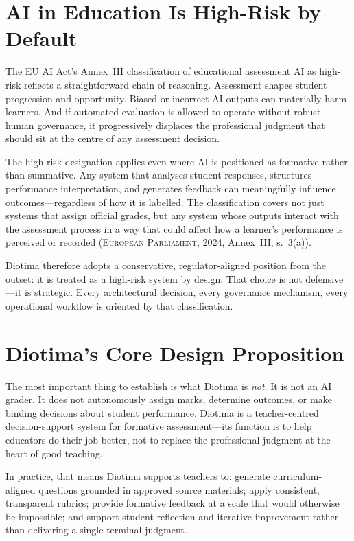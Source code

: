 \documentclass[10pt, a4paper, twocolumn]{article}
\begin{document}
\section{AI in Education Is High-Risk by Default}

The EU AI Act's Annex~III classification of educational assessment AI as high-risk
reflects a straightforward chain of reasoning. Assessment shapes student progression
and opportunity. Biased or incorrect AI outputs can materially harm learners. And if
automated evaluation is allowed to operate without robust human governance, it
progressively displaces the professional judgment that should sit at the centre of any
assessment decision.

The high-risk designation applies even where AI is positioned as formative rather than
summative. Any system that analyses student responses, structures performance
interpretation, and generates feedback can meaningfully influence outcomes---regardless
of how it is labelled. The classification covers not just systems that assign official
grades, but any system whose outputs interact with the assessment process in a way that
could affect how a learner's performance is perceived or recorded (\textsc{European
Parliament}, 2024, Annex~III, s.~3(a)).

Diotima therefore adopts a conservative, regulator-aligned position from the outset: it
is treated as a high-risk system by design. That choice is not defensive---it is
strategic. Every architectural decision, every governance mechanism, every operational
workflow is oriented by that classification.

\section{Diotima's Core Design Proposition}

The most important thing to establish is what Diotima is \textit{not}. It is not an
AI grader. It does not autonomously assign marks, determine outcomes, or make binding
decisions about student performance. Diotima is a teacher-centred decision-support
system for formative assessment---its function is to help educators do their job
better, not to replace the professional judgment at the heart of good teaching.

In practice, that means Diotima supports teachers to: generate curriculum-aligned
questions grounded in approved source materials; apply consistent, transparent rubrics;
provide formative feedback at a scale that would otherwise be impossible; and support
student reflection and iterative improvement rather than delivering a single terminal
judgment.
\end{document}

